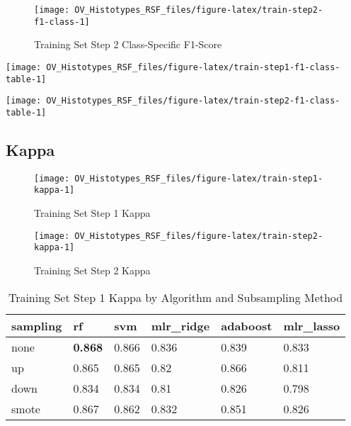 \documentclass[
]{report}
\begin{document}
\begin{figure}[H]

{\centering \texttt{[image: OV\_Histotypes\_RSF\_files/figure-latex/train-step2-f1-class-1]} 

}

\caption{Training Set Step 2 Class-Specific F1-Score}\label{fig:train-step2-f1-class}
\end{figure}

\begin{center}\texttt{[image: OV\_Histotypes\_RSF\_files/figure-latex/train-step1-f1-class-table-1]} \end{center}

\begin{center}\texttt{[image: OV\_Histotypes\_RSF\_files/figure-latex/train-step2-f1-class-table-1]} \end{center}

\hypertarget{kappa-1}{%
\subsection{Kappa}\label{kappa-1}}

\begin{figure}[H]

{\centering \texttt{[image: OV\_Histotypes\_RSF\_files/figure-latex/train-step1-kappa-1]} 

}

\caption{Training Set Step 1 Kappa}\label{fig:train-step1-kappa}
\end{figure}

\begin{figure}[H]

{\centering \texttt{[image: OV\_Histotypes\_RSF\_files/figure-latex/train-step2-kappa-1]} 

}

\caption{Training Set Step 2 Kappa}\label{fig:train-step2-kappa}
\end{figure}

\begin{table}

\caption{\label{tab:train-step1-kappa-table}Training Set Step 1 Kappa by Algorithm and Subsampling Method}
\centering
\begin{tabular}[t]{l|l|l|l|l|l}
\hline
sampling & rf & svm & mlr\_ridge & adaboost & mlr\_lasso\\
\hline
none & \textbf{0.868} & 0.866 & 0.836 & 0.839 & 0.833\\
\hline
up & 0.865 & 0.865 & 0.82 & 0.866 & 0.811\\
\hline
down & 0.834 & 0.834 & 0.81 & 0.826 & 0.798\\
\hline
smote & 0.867 & 0.862 & 0.832 & 0.851 & 0.826\\
\hline
\end{tabular}
\end{table}
\end{document}
